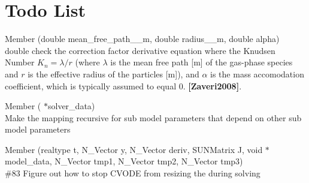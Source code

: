 \chapter{Todo List}
\hypertarget{todo}{}\label{todo}

\begin{DoxyRefList}
\item[Member \doxylink{util_8h_af0918da54a73bf30e7079908caea2efd}{d\+\_\+transition\+\_\+regime\+\_\+correction\+\_\+factor\+\_\+d\+\_\+radius} (double mean\+\_\+free\+\_\+path\+\_\+\+\_\+m, double radius\+\_\+\+\_\+m, double alpha)]\hfill \\
\label{todo__todo000003}%
%
double check the correction factor derivative equation where the Knudsen Number $K_n = \lambda / r$ (where $\lambda$ is the mean free path \mbox{[}m\mbox{]} of the gas-\/phase species and $r$ is the effective radius of the particles \mbox{[}m\mbox{]}), and $ \alpha $ is the mass accomodation coefficient, which is typically assumed to equal 0. {\bfseries [Zaveri2008]}. 
\item[Member \doxylink{camp__solver_8h_a5b485fa25356197023889f3795888e98}{get\+\_\+jac\+\_\+init} (\doxylink{struct_solver_data}{Solver\+Data} \texorpdfstring{$\ast$}{*}solver\+\_\+data)]\hfill \\
\label{todo__todo000002}%
%
Make the  mapping recursive for sub model parameters that depend on other sub model parameters  
\item[Member \doxylink{camp__solver_8h_a78e694c3221a39e0b96a5f40fa0fc0dd}{Jac} (realtype t, N\+\_\+\+Vector y, N\+\_\+\+Vector deriv, SUNMatrix J, void \texorpdfstring{$\ast$}{*}model\+\_\+data, N\+\_\+\+Vector tmp1, N\+\_\+\+Vector tmp2, N\+\_\+\+Vector tmp3)]\hfill \\
\label{todo__todo000001}%
%
\#83 Figure out how to stop CVODE from resizing the  during solving 
\end{DoxyRefList}
